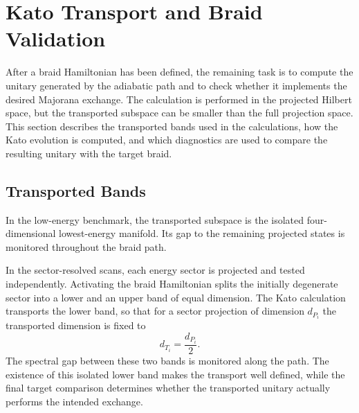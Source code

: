 \section{Kato Transport and Braid Validation}

After a braid Hamiltonian has been defined, the remaining task is to compute the unitary generated by the adiabatic path and to check whether it implements the desired Majorana exchange. The calculation is performed in the projected Hilbert space, but the transported subspace can be smaller than the full projection space. This section describes the transported bands used in the calculations, how the Kato evolution is computed, and which diagnostics are used to compare the resulting unitary with the target braid.

\subsection{Transported Bands}
In the low-energy benchmark, the transported subspace is the isolated four-dimensional lowest-energy manifold. Its gap to the remaining projected states is monitored throughout the braid path.

In the sector-resolved scans, each energy sector is projected and tested independently. Activating the braid Hamiltonian splits the initially degenerate sector into a lower and an upper band of equal dimension. The Kato calculation transports the lower band, so that for a sector projection of dimension $d_{P_i}$ the transported dimension is fixed to
\begin{equation}
d_{T_i}=\frac{d_{P_i}}{2}.
\label{eq:method_sector_transport_dimension}
\end{equation}
The spectral gap between these two bands is monitored along the path. The existence of this isolated lower band makes the transport well defined, while the final target comparison determines whether the transported unitary actually performs the intended exchange.

